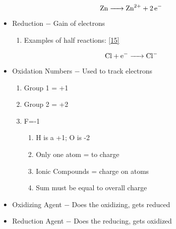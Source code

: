 \documentclass[12pt]{article}
\begin{document}
\begin{itemize}
    \begin{equation}
      \ce{Zn -> Zn^2+ + 2e-}
      \label{14}
    \end{equation}

  \item Reduction $-$ Gain of electrons

    \begin{enumerate}
      \item Examples of half reactions: \eqref{15}
    \end{enumerate}

    \begin{equation}
      \ce{Cl + e- -> Cl-}
      \label{15}
    \end{equation}

  \item Oxidation Numbers $-$ Used to track electrons

    \begin{enumerate}
      \item Group 1 = +1
      \item Group 2 = +2
      \item F=-1

        \begin{enumerate}
          \item H is a +1; O is -2
          \item Only one atom = to charge
          \item Ionic Compounds = charge on atoms
          \item Sum must be equal to overall charge
        \end{enumerate}

    \end{enumerate}

  \item Oxidizing Agent $-$ Does the oxidizing, gets reduced

  \item Reduction Agent $-$ Does the reducing, gets oxidized


\end{itemize}
\end{document}
